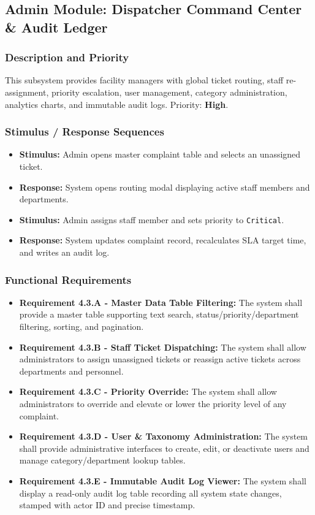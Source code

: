 \documentclass[12pt, a4paper]{article}
\begin{document}
\subsection{Admin Module: Dispatcher Command Center \& Audit Ledger}

\subsubsection{Description and Priority}
This subsystem provides facility managers with global ticket routing, staff re-assignment, priority escalation, user management, category administration, analytics charts, and immutable audit logs. Priority: \textbf{High}.

\subsubsection{Stimulus / Response Sequences}
\begin{itemize}[leftmargin=*]
    \item \textbf{Stimulus:} Admin opens master complaint table and selects an unassigned ticket.
    \item \textbf{Response:} System opens routing modal displaying active staff members and departments.
    \item \textbf{Stimulus:} Admin assigns staff member and sets priority to \texttt{Critical}.
    \item \textbf{Response:} System updates complaint record, recalculates SLA target time, and writes an audit log.
\end{itemize}

\subsubsection{Functional Requirements}
\begin{itemize}[leftmargin=*]
    \item \textbf{Requirement 4.3.A - Master Data Table Filtering:} The system shall provide a master table supporting text search, status/priority/department filtering, sorting, and pagination.
    \item \textbf{Requirement 4.3.B - Staff Ticket Dispatching:} The system shall allow administrators to assign unassigned tickets or reassign active tickets across departments and personnel.
    \item \textbf{Requirement 4.3.C - Priority Override:} The system shall allow administrators to override and elevate or lower the priority level of any complaint.
    \item \textbf{Requirement 4.3.D - User \& Taxonomy Administration:} The system shall provide administrative interfaces to create, edit, or deactivate users and manage category/department lookup tables.
    \item \textbf{Requirement 4.3.E - Immutable Audit Log Viewer:} The system shall display a read-only audit log table recording all system state changes, stamped with actor ID and precise timestamp.
\end{itemize}
\end{document}
